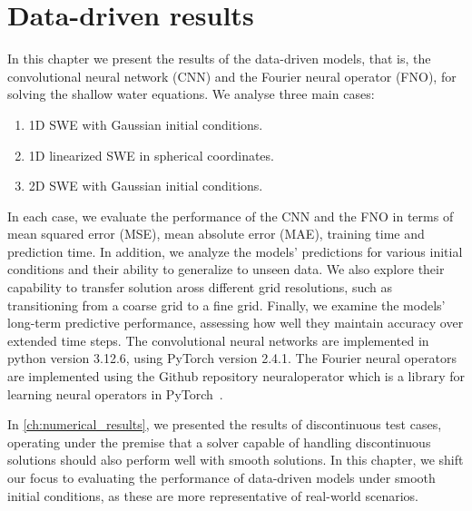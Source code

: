 \chapter{Data-driven results}\label{ch:data-driven-results}
In this chapter we present the results of the data-driven models, that is, the convolutional neural network (CNN) and the Fourier neural operator (FNO), for solving the shallow water equations.
We analyse three main cases:
\begin{enumerate}
    \item 1D SWE with Gaussian initial conditions. 
    \item 1D linearized SWE in spherical coordinates.
    \item 2D SWE with Gaussian initial conditions.
\end{enumerate}
In each case, we evaluate the performance of the CNN and the FNO in terms of mean squared error (MSE), mean absolute error (MAE), training time and prediction time.
In addition, we analyze the models' predictions for various initial conditions and their ability to generalize to unseen data.
We also explore their capability to transfer solution aross different grid resolutions, such as transitioning from a coarse grid to a fine grid.
Finally, we examine the models' long-term predictive performance, assessing how well they maintain accuracy over extended time steps.
The convolutional neural networks are implemented in python version 3.12.6, using PyTorch version 2.4.1.
The Fourier neural operators are implemented using the Github repository neuraloperator which is a library for learning neural operators in PyTorch~\cite{neuraloperator}.

In \autoref{ch:numerical_results}, we presented the results of discontinuous test cases, operating under the premise that a solver capable of handling discontinuous solutions should also perform well with smooth solutions.
In this chapter, we shift our focus to evaluating the performance of data-driven models under smooth initial conditions, as these are more representative of real-world scenarios.

